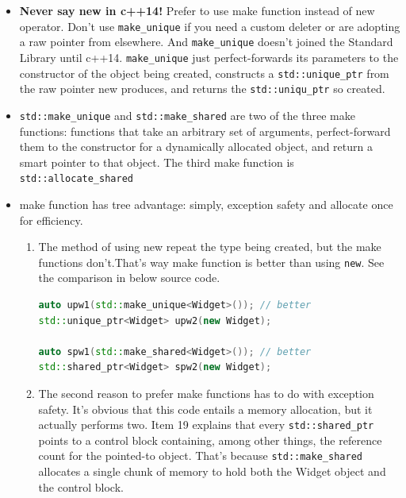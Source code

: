\documentclass[a4paper,11pt,twoside]{book}
\begin{document}
\begin{itemize}
	\item \textbf{Never say new in c++14!} Prefer to use make function instead of new operator. Don't use \texttt{make\_unique} if you need a custom deleter or are adopting a raw pointer from elsewhere. And \texttt{make\_unique} doesn't joined the Standard Library until c++14. \texttt{make\_unique} just perfect-forwards its parameters to the constructor of the object being created, constructs a \texttt{std::unique\_ptr} from the raw pointer new produces, and returns the \texttt{std::uniqu\_ptr} so created.
	
	\item \texttt{std::make\_unique} and \texttt{std::make\_shared} are two of the three make functions: functions that take an arbitrary set of arguments, perfect-forward them to the constructor for a dynamically allocated object, and return a smart pointer to that object. The third make function is \texttt{std::allocate\_shared}
	
	\item make function has tree advantage: simply, exception safety and allocate once for efficiency.
	
	\begin{enumerate}
		\item The method of using new repeat the type being created, but the make functions don't.That's way make function is better than using \texttt{new}. See the comparison in below source code. 
\begin{lstlisting}[frame=single, language=c++, mathescape=true]
auto upw1(std::make_unique<Widget>()); // better
std::unique_ptr<Widget> upw2(new Widget); 
		
auto spw1(std::make_shared<Widget>()); // better
std::shared_ptr<Widget> spw2(new Widget); 
\end{lstlisting}
		
		\item The second reason to prefer make functions has to do with exception safety. It's obvious that this code entails a memory allocation, but it actually performs two. Item 19 explains that every \texttt{std::shared\_ptr} points to a control block containing, among other things, the reference count for the pointed-to object. That's because \texttt{std::make\_shared} allocates a single chunk of memory to hold both the Widget object and the control block.
		
	\end{enumerate}
	

\end{itemize}
\end{document}

